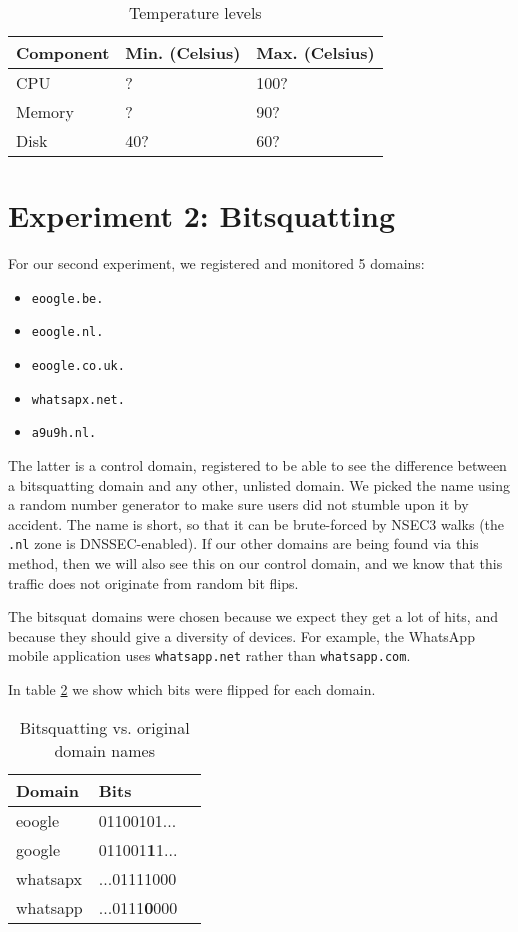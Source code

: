 \documentclass[conference]{IEEEtran}
\begin{document}
\begin{table}[H]
  \centering
  \caption{Temperature levels}
  \label{table-temp}
  \begin{tabular}{|l|l|l|}
    \hline
    \textbf{Component}   & \textbf{Min. (Celsius)} & \textbf{Max. (Celsius)}\\ \hline
    CPU   & ? & 100? \\ \hline
    Memory & ? & 90? \\ \hline
    Disk & 40? & 60? \\ \hline
   \end{tabular}
\end{table}


\section{Experiment 2: Bitsquatting}

For our second experiment, we registered and monitored 5 domains:

\begin{itemize}
  \item \texttt{eoogle.be.}
  \item \texttt{eoogle.nl.}
  \item \texttt{eoogle.co.uk.}
  \item \texttt{whatsapx.net.}
  \item \texttt{a9u9h.nl.}
\end{itemize}

The latter is a control domain, registered to be able to see the difference
between a bitsquatting domain and any other, unlisted domain. We picked the
name using a random number generator to make sure users did not stumble upon it
by accident. The name is short, so that it can be brute-forced by NSEC3 walks
(the \texttt{.nl} zone is DNSSEC-enabled). If our other domains are being found
via this method, then we will also see this on our control domain, and we know
that this traffic does not originate from random bit flips.

The bitsquat domains were chosen because we expect they get a lot of hits, and
because they should give a diversity of devices. For example, the WhatsApp
mobile application uses \texttt{whatsapp.net} rather than
\texttt{whatsapp.com}.

In table \ref{tab:bits} we show which bits were flipped for each domain.

\begin{table}[H]
  \centering
  \caption{Bitsquatting vs. original domain names}
  \label{tab:bits}
  \begin{tabular}{|l|l|l|}
    \hline
    \textbf{Domain}   & \textbf{Bits} \\ \hline
    eoogle   & 01100101... \\ \hline
    google   & 011001\textbf{1}1... \\ \hline
    whatsapx & ...01111000 \\ \hline
    whatsapp & ...0111\textbf{0}000 \\ \hline
   \end{tabular}
\end{table}
\end{document}
